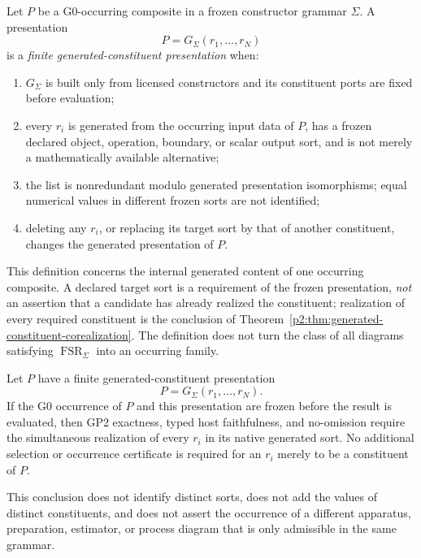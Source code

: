 \documentclass[12pt,a4paper]{article}
\begin{document}
\begin{definition}
\label{p2:def:finite-generated-constituent-presentation}
Let \(P\) be a G0-occurring composite in a frozen constructor grammar
\(\Sigma\).  A presentation
\[
 P=G_{\Sigma}(r_1,\ldots,r_N)
\]
is a \emph{finite generated-constituent presentation} when:
\begin{enumerate}[label=(\roman*),leftmargin=2em]
\item \(G_{\Sigma}\) is built only from licensed constructors and its
      constituent ports are fixed before evaluation;
\item every \(r_i\) is generated from the occurring input data of \(P\), has
      a frozen declared object, operation, boundary, or scalar output sort,
      and is not merely a mathematically available alternative;
\item the list is nonredundant modulo generated presentation isomorphisms;
      equal numerical values in different frozen sorts are not identified;
\item deleting any \(r_i\), or replacing its target sort by that of another
      constituent, changes the generated presentation of \(P\).
\end{enumerate}
This definition concerns the internal generated content of one occurring
composite.  A declared target sort is a requirement of the frozen presentation,
\emph{not} an assertion that a candidate has already realized the constituent;
realization of every required constituent is the conclusion of
Theorem~\ref{p2:thm:generated-constituent-corealization}.  The definition does
not turn the class of all diagrams satisfying
\(\operatorname{FSR}_{\Sigma}\) into an occurring family.
\end{definition}

\begin{theorem}
\label{p2:thm:generated-constituent-corealization}
Let \(P\) have a finite generated-constituent presentation
\[
 P=G_{\Sigma}(r_1,\ldots,r_N).
\]
If the G0 occurrence of \(P\) and this presentation are frozen before the
result is evaluated, then GP2 exactness, typed host faithfulness, and
no-omission require the simultaneous realization of every \(r_i\) in its
native generated sort.  No additional selection or occurrence certificate is
required for an \(r_i\) merely to be a constituent of \(P\).

This conclusion does not identify distinct sorts, does not add the values of
distinct constituents, and does not assert the occurrence of a different
apparatus, preparation, estimator, or process diagram that is only admissible
in the same grammar.
\end{theorem}
\end{document}
